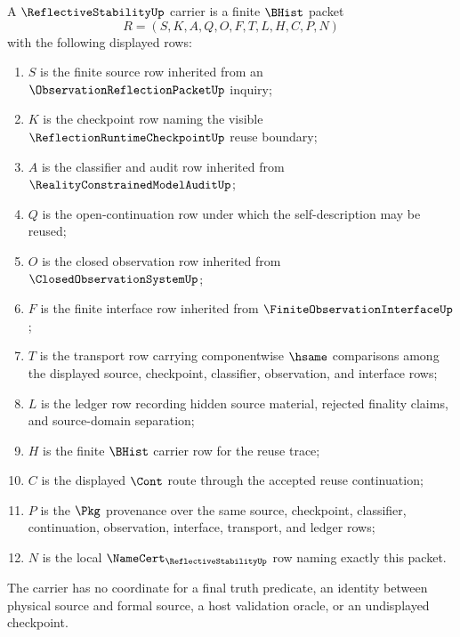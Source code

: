\begin{definition}
\label{def:reflective-stability-carrier}
A $\ReflectiveStabilityUp$ carrier is a finite $\BHist$ packet
$$
R=(S,K,A,Q,O,F,T,L,H,C,P,N)
$$
with the following displayed rows:
\begin{enumerate}
\item $S$ is the finite source row inherited from an $\ObservationReflectionPacketUp$ inquiry;
\item $K$ is the checkpoint row naming the visible $\ReflectionRuntimeCheckpointUp$ reuse boundary;
\item $A$ is the classifier and audit row inherited from $\RealityConstrainedModelAuditUp$;
\item $Q$ is the open-continuation row under which the self-description may be reused;
\item $O$ is the closed observation row inherited from $\ClosedObservationSystemUp$;
\item $F$ is the finite interface row inherited from $\FiniteObservationInterfaceUp$;
\item $T$ is the transport row carrying componentwise $\hsame$ comparisons among the displayed source, checkpoint, classifier, observation, and interface rows;
\item $L$ is the ledger row recording hidden source material, rejected finality claims, and source-domain separation;
\item $H$ is the finite $\BHist$ carrier row for the reuse trace;
\item $C$ is the displayed $\Cont$ route through the accepted reuse continuation;
\item $P$ is the $\Pkg$ provenance over the same source, checkpoint, classifier, continuation, observation, interface, transport, and ledger rows;
\item $N$ is the local $\NameCert_{\ReflectiveStabilityUp}$ row naming exactly this packet.
\end{enumerate}
The carrier has no coordinate for a final truth predicate, an identity between physical source and formal source, a host validation oracle, or an undisplayed checkpoint.
\end{definition}

